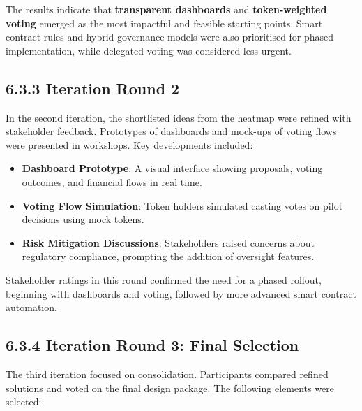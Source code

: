 \documentclass[
  english,
  12pt,
  oneside,
  open=any]{scrbook}
\providecommand{\tightlist}{%
  \setlength{\itemsep}{0pt}\setlength{\parskip}{0pt}}\usepackage{longtable,booktabs,array}
\begin{document}
The results indicate that \textbf{transparent dashboards} and
\textbf{token-weighted voting} emerged as the most impactful and
feasible starting points. Smart contract rules and hybrid governance
models were also prioritised for phased implementation, while delegated
voting was considered less urgent.

\subsection{6.3.3 Iteration Round 2}\label{sec-it2}

In the second iteration, the shortlisted ideas from the heatmap were
refined with stakeholder feedback. Prototypes of dashboards and mock-ups
of voting flows were presented in workshops. Key developments included:

\begin{itemize}
\tightlist
\item
  \textbf{Dashboard Prototype}: A visual interface showing proposals,
  voting outcomes, and financial flows in real time.\\
\item
  \textbf{Voting Flow Simulation}: Token holders simulated casting votes
  on pilot decisions using mock tokens.\\
\item
  \textbf{Risk Mitigation Discussions}: Stakeholders raised concerns
  about regulatory compliance, prompting the addition of oversight
  features.
\end{itemize}

Stakeholder ratings in this round confirmed the need for a phased
rollout, beginning with dashboards and voting, followed by more advanced
smart contract automation.

\subsection{6.3.4 Iteration Round 3: Final Selection}\label{sec-it3}

The third iteration focused on consolidation. Participants compared
refined solutions and voted on the final design package. The following
elements were selected:
\end{document}
